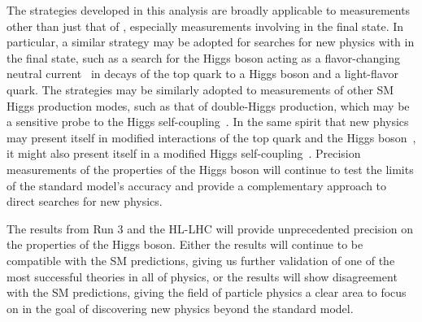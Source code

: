 The strategies developed in this analysis are broadly applicable to measurements other than just that of \ttH, especially measurements involving \Hgg in the final state.
In particular, a similar strategy may be adopted for searches for new physics with \Hgg in the final state, such as a search for the Higgs boson acting as a flavor-changing neutral current~\cite{agashe2013snowmass} in decays of the top quark to a Higgs boson and a light-flavor quark.
The strategies may be similarly adopted to measurements of other SM Higgs production modes, such as that of double-Higgs production, which may be a sensitive probe to the Higgs self-coupling~\cite{DiVita:2017eyz}.
In the same spirit that new physics may present itself in modified interactions of the top quark and the Higgs boson~\cite{why_care_top_yukawa}, it might also present itself in a modified Higgs self-coupling~\cite{Kanemura:2002vm}.
Precision measurements of the properties of the Higgs boson will continue to test the limits of the standard model's accuracy and provide a complementary approach to direct searches for new physics.

The results from Run 3 and the HL-LHC will provide unprecedented precision on the properties of the Higgs boson.
Either the results will continue to be compatible with the SM predictions, giving us further validation of one of the most successful theories in all of physics, or the results will show disagreement with the SM predictions, giving the field of particle physics a clear area to focus on in the goal of discovering new physics beyond the standard model.
